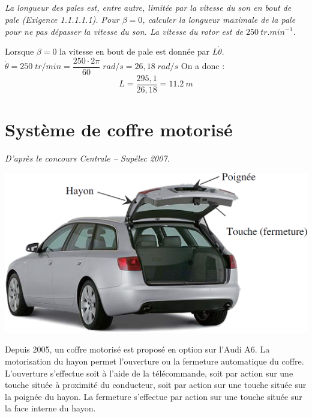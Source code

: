 \documentclass[10pt,fleqn]{article} %
\begin{document}
\begin{multicols}{2}
\subparagraph{}
\textit{La longueur des pales est, entre autre, limitée par la vitesse du son en bout de pale (Exigence 1.1.1.1.1). Pour $\beta=0$, calculer la longueur maximale de la pale pour ne pas dépasser la vitesse du son. La vitesse du rotor est de $\SI{250}{tr.min^{-1}}$.}
\ifprof
\begin{corrige}
Lorsque $\beta=0$ la vitesse en bout de pale est donnée par $L\dot{\theta}$.
$\dot{\theta}=250 \; tr/min = \dfrac{250 \cdot 2 \pi}{60}\;rad/s = 26,18\;rad/s$
On a donc :
$$
L = \dfrac{295,1}{26,18} =\SI{11,2}{m}
$$
\end{corrige}\else \fi

\section*{Système de coffre motorisé}
\setcounter{subparagraph}{0}
\begin{flushleft}
\textit{D'après le concours Centrale -- Supélec 2007.}
\end{flushleft}

\begin{center}
\includegraphics[width=.7\linewidth]{images/A6_coffre}
\end{center}

Depuis 2005, un coffre motorisé est proposé en option sur l’Audi A6. La motorisation du hayon permet l’ouverture ou la fermeture automatique du coffre. L’ouverture s’effectue soit à l’aide de la télécommande, soit par action sur une touche située à proximité du conducteur, soit par action sur une touche située sur la poignée du hayon. La fermeture s’effectue par action sur une touche située sur la face interne du hayon.




\end{multicols}
\end{document}
